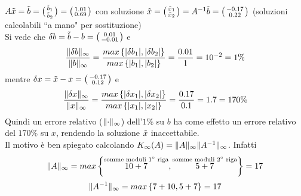  $A\tilde{x}=\tilde{b}=\bigl(\begin{smallmatrix}
    \Tilde{b}_1 \\
    \Tilde{b}_2
\end{smallmatrix}\bigr)=\bigl(\begin{smallmatrix}
    1.01 \\
    0.69
\end{smallmatrix}\bigr)$ con soluzione $\Tilde{x}=\bigl(\begin{smallmatrix}
    \Tilde{x}_1 \\
    \Tilde{x}_2
\end{smallmatrix}\bigr) =A^{-1}\Tilde{b}=\bigl(\begin{smallmatrix}
    -0.17 \\
    0.22
\end{smallmatrix}\bigr)$ (soluzioni calcolabili ``a mano" per sostituzione)\\
Si vede che $\delta b=\Tilde{b}-b = \bigl(\begin{smallmatrix}
    0.01 \\
    -0.01
\end{smallmatrix}\bigr)$ e 
\begin{equation*}
    \frac{\lVert\delta b\rVert_\infty}{\lVert b\rVert_\infty} = \frac{max\left\{ |\delta b_1|,|\delta b_2| \right\}}{max\left\{ |b_1|,|b_2| \right\}} = \frac{0.01}{1} = 10^{-2} = 1\%
\end{equation*} mentre $\delta x = \Tilde{x}-x=\bigl(\begin{smallmatrix}
    -0.17 \\
    0.12
\end{smallmatrix}\bigr)$ e 
\begin{equation*}
    \frac{\lVert\delta x\rVert_\infty}{\lVert x\rVert_\infty} = \frac{max\left\{ |\delta x_1|,|\delta x_2| \right\}}{max\left\{ |x_1|,|x_2| \right\}} = \frac{0.17}{0.1} = 1.7 = 170\%
\end{equation*}
Quindi un errore relativo ($\lVert\cdot\rVert_\infty$) dell'$1\%$ su $b$ ha come effetto un errore relativo del $170\%$ su $x$, rendendo la soluzione $\Tilde{x}$ inaccettabile. \\
Il motivo è ben spiegato calcolando $K_\infty(A)=\lVert A\rVert_\infty \lVert A^{-1}\rVert_\infty$. Infatti
\begin{equation*}
    \lVert A\rVert_\infty = max \left\{ \overset{\text{somme moduli 1$^\circ$ riga}}{10+7}, \overset{\text{somme moduli 2$^\circ$ riga}}{5+7} \right\} = 17
\end{equation*}
\begin{equation*}
    \lVert A^{-1}\rVert_\infty = max \left\{ 7+10, 5+7 \right\} = 17
\end{equation*}
